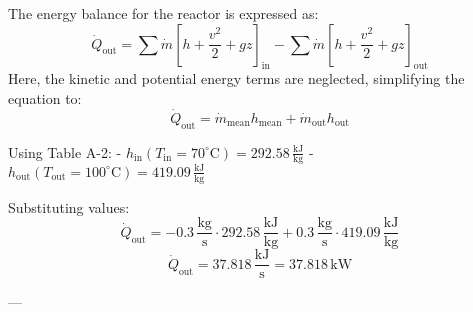 The energy balance for the reactor is expressed as:  
\[
\dot{Q}_{\text{out}} = \sum \dot{m} \left[ h + \frac{v^2}{2} + gz \right]_{\text{in}} - \sum \dot{m} \left[ h + \frac{v^2}{2} + gz \right]_{\text{out}}
\]  
Here, the kinetic and potential energy terms are neglected, simplifying the equation to:  
\[
\dot{Q}_{\text{out}} = \dot{m}_{\text{mean}} h_{\text{mean}} + \dot{m}_{\text{out}} h_{\text{out}}
\]  

Using Table A-2:  
- \( h_{\text{in}} (T_{\text{in}} = 70^\circ\text{C}) = 292.58 \, \frac{\text{kJ}}{\text{kg}} \)  
- \( h_{\text{out}} (T_{\text{out}} = 100^\circ\text{C}) = 419.09 \, \frac{\text{kJ}}{\text{kg}} \)  

Substituting values:  
\[
\dot{Q}_{\text{out}} = -0.3 \, \frac{\text{kg}}{\text{s}} \cdot 292.58 \, \frac{\text{kJ}}{\text{kg}} + 0.3 \, \frac{\text{kg}}{\text{s}} \cdot 419.09 \, \frac{\text{kJ}}{\text{kg}}
\]  
\[
\dot{Q}_{\text{out}} = 37.818 \, \frac{\text{kJ}}{\text{s}} = 37.818 \, \text{kW}
\]  

---